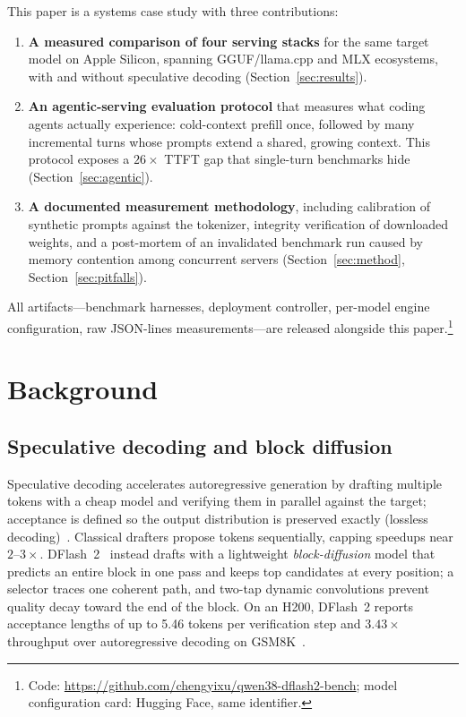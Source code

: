 \documentclass[11pt]{article}
\newcommand{\dflash}{DFlash~2}
\begin{document}
This paper is a systems case study with three contributions:

\begin{enumerate}
\item \textbf{A measured comparison of four serving stacks} for the same target
model on Apple Silicon, spanning GGUF/llama.cpp and MLX ecosystems, with and
without speculative decoding (Section~\ref{sec:results}).
\item \textbf{An agentic-serving evaluation protocol} that measures what coding
agents actually experience: cold-context prefill once, followed by many
incremental turns whose prompts extend a shared, growing context. This protocol
exposes a $26\times$ TTFT gap that single-turn benchmarks hide
(Section~\ref{sec:agentic}).
\item \textbf{A documented measurement methodology}, including calibration of
synthetic prompts against the tokenizer, integrity verification of downloaded
weights, and a post-mortem of an invalidated benchmark run caused by
memory contention among concurrent servers (Section~\ref{sec:method},
Section~\ref{sec:pitfalls}).
\end{enumerate}

All artifacts---benchmark harnesses, deployment controller, per-model engine
configuration, raw JSON-lines measurements---are released alongside this paper.\footnote{Code:
\url{https://github.com/chengyixu/qwen38-dflash2-bench}; model configuration card:
Hugging Face, same identifier.}

\section{Background}
\label{sec:background}

\subsection{Speculative decoding and block diffusion}
Speculative decoding accelerates autoregressive generation by drafting multiple
tokens with a cheap model and verifying them in parallel against the target;
acceptance is defined so the output distribution is preserved exactly
(lossless decoding)~\cite{leviathan2023fast}. Classical drafters propose tokens
sequentially, capping speedups near $2$--$3\times$. \dflash{}~\cite{dflash}
instead drafts with a lightweight \emph{block-diffusion} model that predicts an
entire block in one pass and keeps top candidates at every position; a selector
traces one coherent path, and two-tap dynamic convolutions prevent quality decay
toward the end of the block. On an H200, \dflash{} reports acceptance lengths of
up to 5.46 tokens per verification step and $3.43\times$ throughput over
autoregressive decoding on GSM8K~\cite{dflash2card}.
\end{document}
